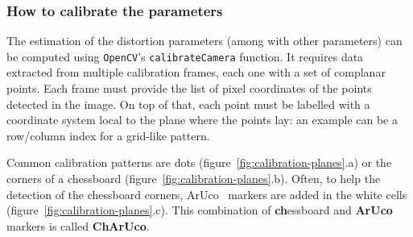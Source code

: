 \subsubsection{How to calibrate the parameters}

The estimation of the distortion parameters (among with other parameters) can be computed using \texttt{OpenCV}'s \texttt{calibrateCamera} function.
It requires data extracted from multiple calibration frames, each one with a set of complanar points.
Each frame must provide the list of pixel coordinates of the points detected in the image.
On top of that, each point must be labelled with a coordinate system local to the plane where the points lay: an example can be a row/column index for a grid-like pattern.

Common calibration patterns are dots (figure~\ref{fig:calibration-planes}.a) or the corners of a chessboard (figure~\ref{fig:calibration-planes}.b).
Often, to help the detection of the chessboard corners, ArUco~\cite{aruco} markers are added in the white cells (figure~\ref{fig:calibration-planes}.c).
This combination of \textbf{ch}essboard and \textbf{ArUco} markers is called \textbf{ChArUco}.

